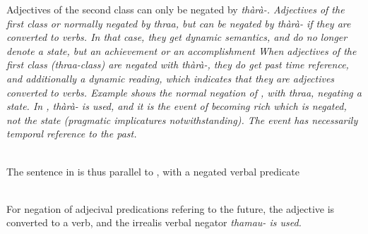 
Adjectives of the second class can only be negated by \em thàrà-\em. Adjectives of the first class or normally negated by \em thraa\em, but can be negated by \em thàrà- \em if they are converted to verbs. In that case, they get dynamic semantics, and do no longer denote a state, but an achievement or an accomplishment
When adjectives of the first class (\em thraa\em-class) are negated with \em thàrà-\em, they do get past time reference, and additionally a dynamic reading, which indicates that they are adjectives converted to verbs. Example  shows the normal negation of , with \em thraa\em, negating a state. In , \em thàrà- \em is used, and it is the event of becoming rich which is negated, not the state (pragmatic implicatures notwithstanding). The event has necessarily temporal reference to the past.


\\

The sentence in  is thus parallel to , with a negated verbal predicate

\\

For negation of adjecival predications refering to the future, the adjective is converted to a verb, and the irrealis verbal negator \em thamau- \em is used.


 \\

